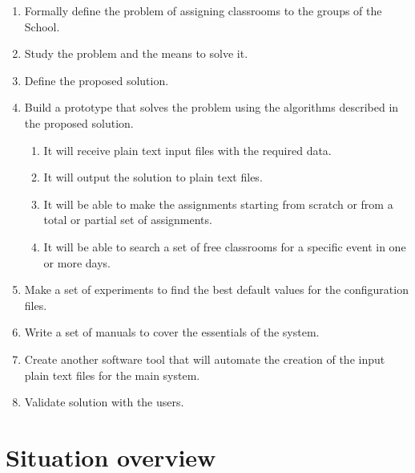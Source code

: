 \begin{enumerate}

    \item Formally define the problem of assigning classrooms to the groups of the School.

    \item Study the problem and the means to solve it.

    \item Define the proposed solution.

    \item Build a prototype that solves the problem using the algorithms described in the proposed solution.

        \begin{enumerate}

            \item It will receive plain text input files with the required data.

            \item It will output the solution to plain text files.

            \item It will be able to make the assignments starting from scratch or from a total or partial set of assignments.

            \item It will be able to search a set of free classrooms for a specific event in one or more days.

        \end{enumerate}

    \item Make a set of experiments to find the best default values for the configuration files.

    \item Write a set of manuals to cover the essentials of the system.

    \item Create another software tool that will automate the creation of the input plain text files for the main system.

    \item Validate solution with the users.

\end{enumerate}


\section{Situation overview}

